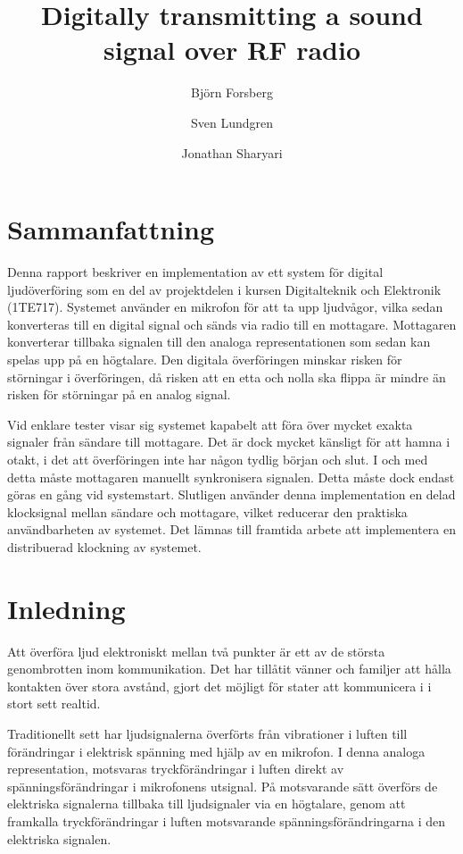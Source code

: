 \documentclass[a4paper,10pt]{article}
\title{Digitally transmitting a sound signal over RF radio}
\author{Bj{\"o}rn Forsberg \and Sven Lundgren \and Jonathan Sharyari}
\begin{document}
\maketitle

\section{Sammanfattning}

Denna rapport beskriver en implementation av ett system för digital 
ljudöverföring som en del av projektdelen i kursen Digitalteknik och Elektronik 
(1TE717). Systemet använder en mikrofon för att ta upp ljudvågor, vilka sedan
konverteras till en digital signal och sänds via radio till en mottagare.
Mottagaren konverterar tillbaka signalen till den analoga representationen som
sedan kan spelas upp på en högtalare. Den digitala överföringen minskar risken
för störningar i överföringen, då risken att en etta och nolla ska flippa är 
mindre än risken för störningar på en analog signal.

Vid enklare tester visar sig systemet kapabelt att föra över mycket exakta 
signaler från sändare till mottagare. Det är dock mycket känsligt för att hamna
i otakt, i det att överföringen inte har någon tydlig början och slut. I och med
detta måste mottagaren manuellt synkronisera signalen. Detta måste dock endast
göras en gång vid systemstart. Slutligen använder denna implementation en delad
klocksignal mellan sändare och mottagare, vilket reducerar den praktiska 
användbarheten av systemet. Det lämnas till framtida arbete att implementera en
distribuerad klockning av systemet.


\section{Inledning}

Att överföra ljud elektroniskt mellan två punkter är ett av de största 
genombrotten inom kommunikation. Det har tillåtit vänner och familjer  att hålla 
kontakten över stora avstånd, gjort det möjligt för stater att kommunicera i i
stort sett realtid.

Traditionellt sett har ljudsignalerna överförts från vibrationer i luften till
förändringar i elektrisk spänning med hjälp av en mikrofon. I denna analoga 
representation, motsvaras tryckförändringar i luften direkt av 
spänningsförändringar i mikrofonens utsignal. På motsvarande sätt överförs de
elektriska signalerna tillbaka till ljudsignaler via en högtalare, genom att 
framkalla tryckförändringar i luften motsvarande spänningsförändringarna i
den elektriska signalen.
\end{document}
